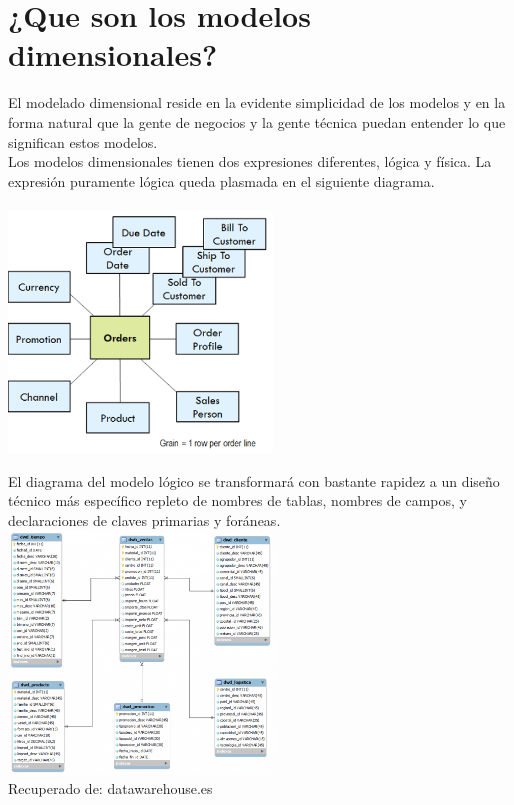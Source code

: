 \section{¿Que son los modelos dimensionales?} 
El modelado dimensional reside en la evidente simplicidad de los modelos y en la forma natural que la gente de negocios y la gente técnica puedan entender lo que significan estos modelos.
\\

Los modelos dimensionales tienen dos expresiones diferentes, lógica y física. La expresión puramente lógica queda plasmada en el siguiente diagrama.
\\
\\
	\includegraphics[width=7cm]{./Imagenes/dimensional} 

El diagrama del modelo lógico se transformará con bastante rapidez a un diseño técnico más específico repleto de nombres de tablas, nombres de campos, y declaraciones de claves primarias y foráneas.
\\
\includegraphics[width=7cm]{./Imagenes/fisica} 
\\
Recuperado de: datawarehouse.es
